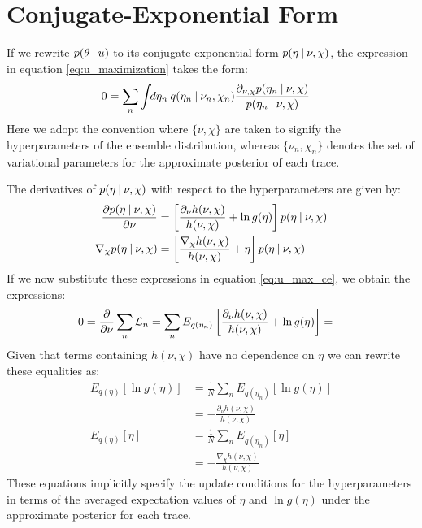\section{Conjugate-Exponential Form}

If we rewrite $p(\theta \:|\: u)$ to its conjugate exponential form $p(\eta \:|\: \nu,\chi)$, the expression in equation \ref{eq:u_maximization} takes the form:
\begin{align}
    0
    &= 
    \sum_n \int \!\!d\eta_n \: 
        q(\eta_n \:|\: \nu_n, \chi_n) 
        \frac{\partial_{\nu,\chi} p(\eta_n \:|\: \nu, \chi)}
             {p(\eta_n \:|\: \nu,\chi)}
       \label{eq:u_max_ce}
\end{align}
Here we adopt the convention where $\{\nu,\chi\}$ are taken to signify the hyperparameters of the ensemble distribution, whereas $\{\nu_n, \chi_n\}$ denotes the set of variational parameters for the approximate posterior of each trace. 

The derivatives of $p(\eta \:|\: \nu,\chi)$ with respect to the hyperparameters are given by:
\begin{align}
    \frac{\partial p(\eta \:|\: \nu,\chi)}{\partial \nu}
    &=
    \left[
      \frac{\partial_\nu h(\nu,\chi)}{h(\nu,\chi)}
      +
      \ln g(\eta) 
    \right]
    p(\eta \:|\: \nu,\chi)
    \\
    \nabla_\chi p(\eta \:|\: \nu,\chi)
    &=
    \left[
      \frac{\nabla_\chi h(\nu,\chi)}{h(\nu,\chi)}
      +
      \eta 
    \right]
    p(\eta \:|\: \nu,\chi)
\end{align}
If we now substitute these expressions in equation \ref{eq:u_max_ce}, we obtain the expressions:
\begin{align}
  0
  &=
  \frac{\partial }{\partial \nu} \sum_n \mathcal{L}_n
  = 
  \sum_n 
   E_{q(\eta_n)}
   \left[
      \frac{\partial_\nu h(\nu,\chi)}{h(\nu,\chi)}
      +
      \ln g(\eta) 
   \right]
   = 
\end{align}
Given that terms containing $h(\nu,\chi)$ have no dependence on $\eta$ we can rewrite these equalities as:
\begin{align}
   E_{q(\eta)}
   \left[
     \ln g(\eta)
   \right]
   &=
   \frac{1}{N}
   \sum_n
   E_{q(\eta_n)}
   \left[
     \ln g(\eta)
   \right] \\
   &=
   -\frac{\partial_\nu h(\nu,\chi)}{h(\nu,\chi)}
   \\
   E_{q(\eta)}
   \left[
     \eta
   \right]
   &=
   \frac{1}{N}
   \sum_n
   E_{q(\eta_n)}
   \left[
     \eta
   \right] \\
   &=
   -\frac{\nabla_\chi h(\nu,\chi)}{h(\nu,\chi)}
\end{align}
These equations implicitly specify the update conditions for the hyperparameters in terms of the averaged expectation values of $\eta$ and $\ln g(\eta)$ under the approximate posterior for each trace.

